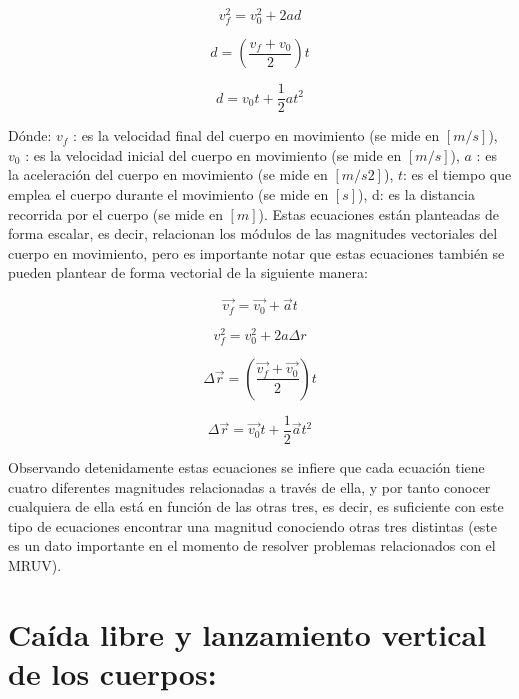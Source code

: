 \documentclass[a5paper,pagesize,10pt,bibtotoc,pointlessnumbers,
normalheadings,DIV=9,fleqn,x11names,table,twoside=false]{scrbook}
\begin{document}
\begin{equation}
 v_f^2 = v_0^2 + 2ad
\end{equation}

\begin{equation}
 d = (\frac{v_f+v_0}{2})t
\end{equation}

\begin{equation}
 d = v_0t+ \frac{1}{2}at^2
\end{equation}

Dónde: $v_f$ : es la velocidad final del cuerpo en movimiento (se mide en $[m/s]$), $v_0$ : es la velocidad inicial del cuerpo en 
movimiento (se mide en $[m/s]$), $a$ : es la aceleración del cuerpo en movimiento (se mide en $[m/s 2]$), $t$: es el tiempo que 
emplea el cuerpo durante el movimiento (se mide en $[s]$), d: es la distancia recorrida por el cuerpo (se mide en $[m]$). Estas 
ecuaciones están planteadas de forma escalar, es decir, relacionan los módulos de las magnitudes vectoriales del cuerpo en 
movimiento, pero es importante notar que estas ecuaciones también se pueden plantear de forma vectorial de la siguiente manera: 

\begin{equation}
\vec{v_f} = \vec{v_0} + \vec{a}t 
\end{equation}

\begin{equation}
 v_f^2 = v_0^2+2a\Delta r
\end{equation}

\begin{equation}
 \Delta \vec{r} = (\frac{\vec{v_f}+\vec{v_0}}{2})t
\end{equation}

\begin{equation}
 \Delta \vec{r} = \vec{v_0}t + \frac{1}{2}\vec{a}t^2
\end{equation}
 
Observando detenidamente estas ecuaciones se infiere que cada ecuación tiene cuatro diferentes magnitudes relacionadas 
a través de ella, y por tanto conocer cualquiera de ella está en función de las otras tres, es decir, es suficiente con 
este tipo de ecuaciones encontrar una magnitud conociendo otras tres distintas (este es un dato importante en el 
momento 
de resolver problemas relacionados con el MRUV).

\section{Caída libre y lanzamiento vertical de los cuerpos:}
\end{document}
